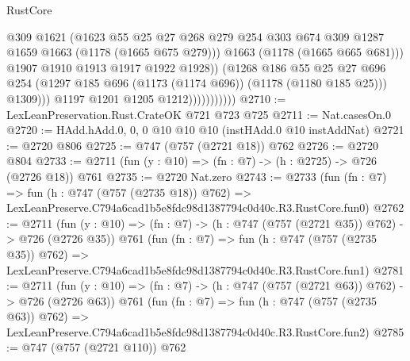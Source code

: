 \begin{lexlean}{RustCore}
\begin{coremodule}
                                    @309
                                    @1621
                                    (@1623
                                      @55
                                      @25
                                      @27
                                      @268
                                      @279
                                      @254
                                      @303
                                      @674
                                      @309
                                      @1287
                                      @1659
                                      @1663
                                      (@1178 (@1665 @675 @279)))
                                    @1663
                                    (@1178 (@1665 @665 @681)))
                                  @1907
                                  @1910
                                  @1913
                                  @1917
                                  @1922
                                  @1928))
                              (@1268
                                @186
                                @55
                                @25
                                @27
                                @696
                                @254
                                (@1297 @185 @696 (@1173 (@1174 @696)) (@1178 (@1180 @185 @25)))
                                @1309)))
                          @1197
                          @1201
                          @1205
                          @1212)))))))))))
@2710 := LexLeanPreservation.Rust.CrateOK @721 @723 @725
@2711 := Nat.casesOn.{0}
@2720 := HAdd.hAdd.{0, 0, 0} @10 @10 @10 (instHAdd.{0} @10 instAddNat)
@2721 := @2720 @806
@2725 := @747 (@757 (@2721 @18)) @762
@2726 := @2720 @804
@2733 := @2711 (fun (y : @10) => (fn : @7) -> (h : @2725) -> @726 (@2726 @18)) @761
@2735 := @2720 Nat.zero
@2743 := @2733
    (fun (fn : @7) =>
    fun (h : @747 (@757 (@2735 @18)) @762) =>
    LexLeanPreserve.C794a6cad1b5e8fdc98d1387794c0d40c.R3.RustCore.fun0)
@2762 := @2711
    (fun (y : @10) => (fn : @7) -> (h : @747 (@757 (@2721 @35)) @762) -> @726 (@2726 @35))
    @761
    (fun (fn : @7) =>
    fun (h : @747 (@757 (@2735 @35)) @762) =>
    LexLeanPreserve.C794a6cad1b5e8fdc98d1387794c0d40c.R3.RustCore.fun1)
@2781 := @2711
    (fun (y : @10) => (fn : @7) -> (h : @747 (@757 (@2721 @63)) @762) -> @726 (@2726 @63))
    @761
    (fun (fn : @7) =>
    fun (h : @747 (@757 (@2735 @63)) @762) =>
    LexLeanPreserve.C794a6cad1b5e8fdc98d1387794c0d40c.R3.RustCore.fun2)
@2785 := @747 (@757 (@2721 @110)) @762

\end{coremodule}
\end{lexlean}
